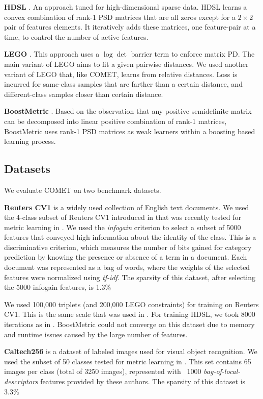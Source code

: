 \documentclass{article} %
\begin{document}
\textbf{HDSL} \cite{hdsl}. An approach tuned for high-dimensional sparse data. HDSL learns a convex combination of rank-1 PSD matrices that are all zeros except for a $2\times2$ pair of features elements. It iteratively adds these matrices, one feature-pair at a time, to control the number of active features.

\textbf{LEGO} \cite{lego}. This approach uses a $\log \det$ barrier term to enforce matrix PD. The main variant of LEGO aims to fit a given pairwise distances. We used another variant of LEGO that, like COMET, learns from relative distances. Loss is incurred for same-class samples that are farther than a certain distance, and different-class samples closer than certain distance.

\textbf{BoostMetric} \cite{boost}. Based on the observation that any positive semidefinite matrix can be decomposed into linear positive combination of rank-1 matrices, BoostMetric uses rank-1 PSD matrices as weak learners within a boosting based learning process.


\subsection{Datasets}
We evaluate COMET on two benchmark datasets.

\textbf{Reuters CV1} is a widely used collection of English text documents. We used the 4-class subset of Reuters CV1 introduced in \cite{CaiRCV14} that was recently tested for metric learning in \cite{hdsl}. We used the \textit{infogain} criterion \cite{infogain} to select a subset of 5000 features that conveyed high information about the identity of the class. This is a discriminative criterion, which measures the number of bits gained for category prediction by knowing the presence or absence of a term in a document. Each document was represented as a bag of words, where the weights of the selected features were normalized using \textit{tf-idf}. The sparsity of this dataset, after selecting the 5000 infogain features, is 1.3\%

We used 100,000 triplets (and 200,000 LEGO constraints) for training on Reuters CV1. This is the same scale that was used in \cite{hdsl}. For training HDSL, we took 8000 iterations as in \cite{hdsl}. BoostMetric could not converge on this dataset due to memory and runtime issues caused by the large number of features.

\textbf{Caltech256} is a dataset of labeled images used for visual object recognition. We used the subset of 50 classes tested for metric learning in \cite{OASIS}. This set contains 65 images per class (total of 3250 images), represented with ~1000 \textit{bag-of-local-descriptors} features provided by these authors. The sparsity of this dataset is 3.3\%
\end{document}
